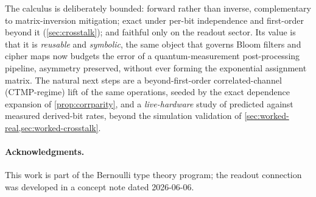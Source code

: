 \documentclass[a4paper,onecolumn,unpublished,nopdfoutputerror,allowtoday]{quantumarticle}
\numberwithin{equation}{section}
\theoremstyle{plain}
\theoremstyle{definition}
\theoremstyle{remark}
\begin{document}
The calculus is deliberately bounded: forward rather than inverse,
complementary to matrix-inversion mitigation; exact under per-bit independence
and first-order beyond it (\cref{sec:crosstalk}); and faithful only on the
readout sector. Its value is that it is \emph{reusable} and \emph{symbolic}, the same
object that governs Bloom filters and cipher maps now budgets the error of a
quantum-measurement post-processing pipeline, asymmetry preserved, without ever
forming the exponential assignment matrix. The natural next steps are a
beyond-first-order correlated-channel (CTMP-regime) lift of the same
operations, seeded by the exact dependence expansion of \cref{prop:corrparity},
and a \emph{live-hardware} study of predicted against measured derived-bit
rates, beyond the simulation validation of
\cref{sec:worked-real,sec:worked-crosstalk}.

\paragraph{Acknowledgments.} This work is part of the Bernoulli type theory
program; the readout connection was developed in a concept note dated 2026-06-06.


\end{document}

